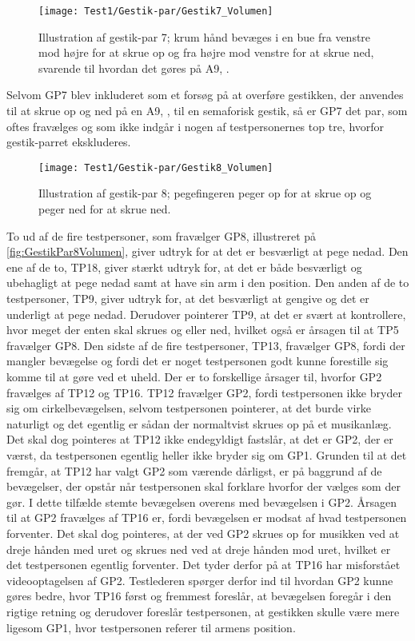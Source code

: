 %
\begin{figure}[H]
	\centering
	\texttt{[image: Test1/Gestik-par/Gestik7\_Volumen]}
	\caption{Illustration af gestik-par 7; krum hånd bevæges i en bue fra venstre mod højre for at skrue op og fra højre mod venstre for at skrue ned, svarende til hvordan det gøres på A9, \parencite{WEB:BeoplayA9}.}
	\label{fig:GestikPar7Volumen}
\end{figure}
\noindent
%
Selvom GP7 blev inkluderet som et forsøg på at overføre gestikken, der anvendes til at skrue op og ned på en A9, \parencite{WEB:BeoplayA9}, til en semaforisk gestik, så er GP7 det par, som oftes fravælges og som ikke indgår i nogen af testpersonernes top tre, hvorfor gestik-parret ekskluderes.
%
\begin{figure}[H]
	\centering
	\texttt{[image: Test1/Gestik-par/Gestik8\_Volumen]}
	\caption{Illustration af gestik-par 8; pegefingeren peger op for at skrue op og peger ned for at skrue ned.}
	\label{fig:GestikPar8Volumen}
\end{figure}
\noindent
%
To ud af de fire testpersoner, som fravælger GP8, illustreret på \autoref{fig:GestikPar8Volumen}, giver udtryk for at det er besværligt at pege nedad. Den ene af de to, TP18, giver stærkt udtryk for, at det er både besværligt og ubehagligt at pege nedad samt at have sin arm i den position. Den anden af de to testpersoner, TP9, giver udtryk for, at det besværligt at gengive og det er underligt at pege nedad. Derudover pointerer TP9, at det er svært at kontrollere, hvor meget der enten skal skrues og eller ned, hvilket også er årsagen til at TP5 fravælger GP8. Den sidste af de fire testpersoner, TP13, fravælger GP8, fordi der mangler bevægelse og fordi det er noget testpersonen godt kunne forestille sig komme til at gøre ved et uheld. \blankline 
%
Der er to forskellige årsager til, hvorfor GP2 fravælges af TP12 og TP16. TP12 fravælger GP2, fordi testpersonen ikke bryder sig om cirkelbevægelsen, selvom testpersonen pointerer, at det burde virke naturligt og det egentlig er sådan der normaltvist skrues op på et musikanlæg. Det skal dog pointeres at TP12 ikke endegyldigt fastslår, at det er GP2, der er værst, da testpersonen egentlig heller ikke bryder sig om GP1. Grunden til at det fremgår, at TP12 har valgt GP2 som værende dårligst, er på baggrund af de bevægelser, der opstår når testpersonen skal forklare hvorfor der vælges som der gør. I dette tilfælde stemte bevægelsen overens med bevægelsen i GP2. Årsagen til at GP2 fravælges af TP16 er, fordi bevægelsen er modsat af hvad testpersonen forventer. Det skal dog pointeres, at der ved GP2 skrues op for musikken ved at dreje hånden med uret og skrues ned ved at dreje hånden mod uret, hvilket er det testpersonen egentlig forventer. Det tyder derfor på at TP16 har misforstået videooptagelsen af GP2. Testlederen spørger derfor ind til hvordan GP2 kunne gøres bedre, hvor TP16 først og fremmest foreslår, at bevægelsen foregår i den rigtige retning og derudover foreslår testpersonen, at gestikken skulle være mere ligesom GP1, hvor testpersonen referer til armens position. 

